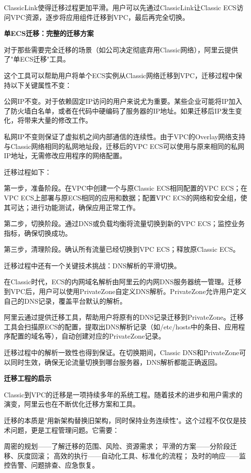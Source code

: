 ClassicLink使得迁移过程更加平滑。用户可以先通过ClassicLink让Classic ECS访问VPC资源，逐步将应用组件迁移到VPC，最后再完全切换。

\textbf{单ECS迁移：完整的迁移方案}

对于那些需要完全迁移的场景（如公司决定彻底弃用Classic网络），阿里云提供了"单ECS迁移"工具。

这个工具可以帮助用户将单个ECS实例从Classic网络迁移到VPC，迁移过程中保持以下关键属性不变：

公网IP不变。对于依赖固定IP访问的用户来说尤为重要。某些企业可能将IP加入了防火墙白名单，或者在代码中硬编码了服务器的IP地址。如果迁移后IP发生变化，将带来大量的修改工作。

私网IP不变则保证了虚拟机之间内部通信的连续性。由于VPC的Overlay网络支持与Classic网络相同的私网地址段，迁移后的VPC ECS可以使用与原来相同的私网IP地址，无需修改应用程序的网络配置。

迁移过程如下：

第一步，准备阶段。在VPC中创建一个与原Classic ECS相同配置的VPC ECS；在VPC ECS上部署与原ECS相同的应用和数据；配置VPC ECS的网络和安全组，使其可达；进行功能测试，确保应用正常工作。

第二步，切换阶段。通过DNS或负载均衡将流量切换到新的VPC ECS；监控业务指标，确保切换成功。

第三步，清理阶段。确认所有流量已经切换到VPC ECS；释放原Classic ECS。

迁移过程中还有一个关键技术挑战：DNS解析的平滑切换。

在Classic时代，ECS的内网域名解析由阿里云的内网DNS服务器统一管理。迁移到VPC后，用户可以使用PrivateZone自定义DNS解析。PrivateZone允许用户定义自己的DNS记录，覆盖平台默认的解析。

阿里云通过提供迁移工具，帮助用户将原有的DNS记录迁移到PrivateZone。迁移工具会扫描原ECS的配置，提取出DNS解析记录（如/etc/hosts中的条目、应用程序配置的域名等），自动创建对应的PrivateZone记录。

迁移过程中的解析一致性也得到保证。在切换期间，Classic DNS和PrivateZone可以同时生效，确保无论流量切换到哪台服务器，DNS解析都能正确返回。

\textbf{迁移工程的启示}

Classic到VPC的迁移是一项持续多年的系统工程。随着技术的进步和用户需求的演变，阿里云也在不断优化迁移方案和工具。

迁移的本质是"用新架构替换旧架构，同时保持业务连续性"。这个过程不仅仅是技术问题，更是工程管理问题。它需要：

周密的规划——了解迁移的范围、风险、资源需求；
平滑的方案——分阶段迁移、灰度回滚；
高效的执行——自动化工具、标准化的流程；
及时的响应——监控告警、问题排查、应急恢复。

